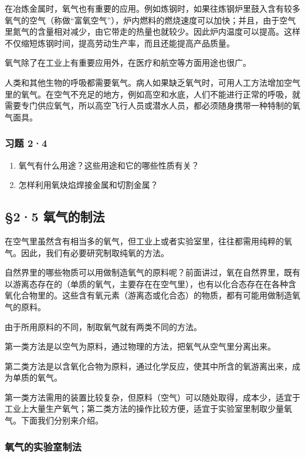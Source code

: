 在冶炼金属时，氧气也有重要的应用。例如炼钢时，如果往炼钢炉里鼓入含有较多氧气的空气（称做``富氧空气''），炉内燃料的燃烧速度可以加快；并且，由于空气里氮气的含量相对减少，由它带走的热量也就较少。因此炉内温度可以提高。这样不仅缩短炼钢时间，提高劳动生产率，而且还能提高产品质量。

氧气除了在工业上有重要应用外，在医疗和航空等方面用途也很广。

人类和其他生物的呼吸都需要氧气。病人如果缺乏氧气时，可用人工方法增加空气里的氧气。在空气不充足的地方，例如高空和水底，人们不能进行正常的呼吸，就需要专门供应氧气，所以高空飞行人员或潜水人员，都必须随身携带一种特制的氧气面具。

\subsubsection{习题 2·4}

\begin{enumerate}
\item
  氧气有什么用途？这些用途和它的哪些性质有关？
\item
  怎样利用氧炔焰焊接金属和切割金属？
\end{enumerate}

\subsection{§2·5 氧气的制法}

在空气里虽然含有相当多的氧气，但工业上或者实验室里，往往都需用纯粹的氧气。因此，我们有必要研究制取纯氧的方法。

自然界里的哪些物质可以用做制造氧气的原料呢？前面讲过，氧在自然界里，既有以游离态存在的（单质的氧气，主要存在在空气里），也有以化合态存在在各种含氧化合物里的。这些含有氧元素（游离态或化合态）的物质，都有可能用做制造氧气的原料。

由于所用原料的不同，制取氧气就有两类不同的方法。

第一类方法是以空气为原料，通过物理的方法，把氧气从空气里分离出来。

第二类方法是以含氧化合物为原料，通过化学反应，使其中所含的氧游离出来，成为单质的氧气。

第一类方法需用的装置比较复杂，但原料（空气）可以随处取得，成本少，适宜于工业上大量生产氧气；第二类方法的操作比较方便，适宜于实验室里制取少量氧气。下面我们分别来介绍。

\subsubsection{氧气的实验室制法}

